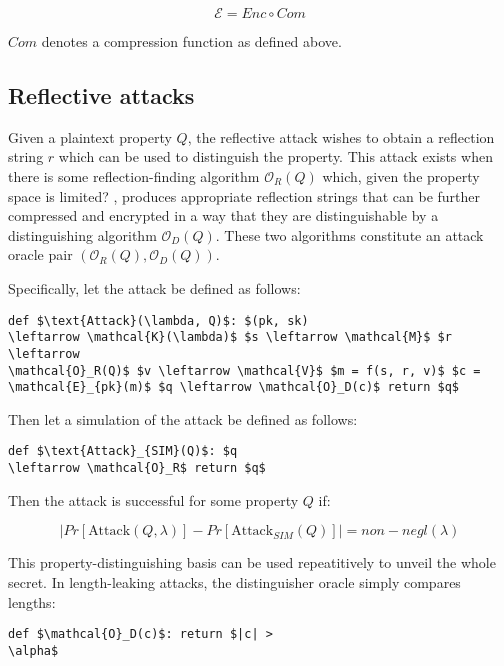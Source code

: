 \documentclass{article} \usepackage[utf8]{inputenc}
\begin{document}
\begin{equation*} \mathcal{E} = Enc \circ Com \end{equation*}

$Com$ denotes a compression function as defined above.

\subsection*{Reflective attacks}

Given a plaintext property $Q$, the reflective attack wishes to obtain a
reflection string $r$ which can be used to distinguish the property. This
attack exists when there is some reflection-finding algorithm
$\mathcal{O}_R(Q)$ which, given the property %
space is limited?  , produces appropriate reflection strings that can be
further compressed and encrypted in a way that they are distinguishable by a
distinguishing algorithm $\mathcal{O}_D(Q)$.  These two algorithms constitute
an attack oracle pair $(\mathcal{O}_R(Q), \mathcal{O}_D(Q))$.

Specifically, let the attack be defined as follows:

\begin{lstlisting}[texcl,mathescape] def $\text{Attack}(\lambda, Q)$: $(pk, sk)
\leftarrow \mathcal{K}(\lambda)$ $s \leftarrow \mathcal{M}$ $r \leftarrow
\mathcal{O}_R(Q)$ $v \leftarrow \mathcal{V}$ $m = f(s, r, v)$ $c =
\mathcal{E}_{pk}(m)$ $q \leftarrow \mathcal{O}_D(c)$ return $q$
\end{lstlisting}

Then let a simulation of the attack be defined as follows:

\begin{lstlisting}[texcl,mathescape] def $\text{Attack}_{SIM}(Q)$: $q
\leftarrow \mathcal{O}_R$ return $q$ \end{lstlisting}

Then the attack is successful for some property $Q$ if:

\begin{equation*} |Pr[\text{Attack}(Q, \lambda)] - Pr[\text{Attack}_{SIM}(Q)]|
= non-negl(\lambda) \end{equation*}

This property-distinguishing basis can be used repeatitively to unveil the
whole secret.  In length-leaking attacks, the distinguisher oracle simply
compares lengths:

\begin{lstlisting}[texcl,mathescape] def $\mathcal{O}_D(c)$: return $|c| >
\alpha$ \end{lstlisting}
\end{document}
